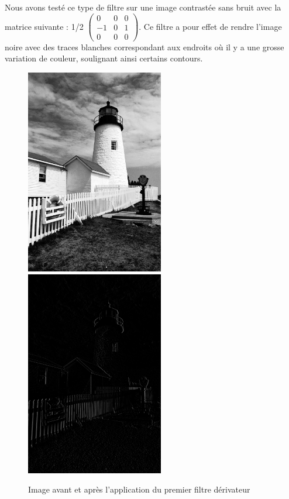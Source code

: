Nous avons testé ce type de filtre sur une image contrastée sans bruit avec la matrice suivante : 1/2
$\begin{pmatrix}
   0 & 0 & 0\\
   -1 & 0 & 1\\
   0 & 0 & 0
\end{pmatrix}$.
Ce filtre a pour effet de rendre l'image noire avec des traces blanches correspondant aux endroits où il y a une
grosse variation de couleur, soulignant ainsi certains contours.

\begin{figure}[H]
      \center
      \includegraphics[width=6cm]{ressources/tp4/phare_contraste.png}
      \includegraphics[width=6cm]{ressources/tp4/phare_mat_demi.png}
      \caption{Image avant et après l'application du premier filtre dérivateur}
\end{figure}

